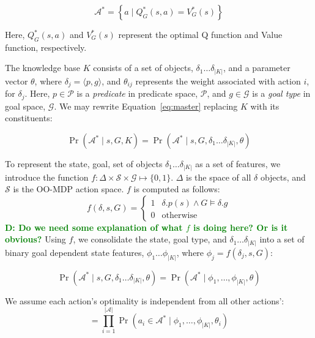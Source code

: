 \documentclass[conference]{IEEEtran}
\newcommand{\dnote}[1]{\textcolor{Green}{\textbf{D: #1}}}
\begin{document}
\begin{equation}
\mathcal{A}^* = \left\{ a \mid Q^*_G(s,a) = V^*_G(s) \right\}
\label{eq:opt_act_set}
\end{equation}

Here, $Q^*_G(s,a)$ and $V^*_G(s)$ represent the optimal Q function and 
Value function, respectively.

The knowledge base $K$ consists of a set of objects, $\delta_1 \ldots \delta_{|K|}$, and a 
parameter vector $\theta$, where $\delta_j = \langle p, g \rangle$, and $\theta_{ij}$
represents the weight associated with action $i$, for $\delta_j$. Here, $p \in \mathcal{P}$
is a {\it predicate} in predicate space, $\mathcal{P}$, and $g \in \mathcal{G}$ is a {\it goal type}
in goal space, $\mathcal{G}$. We may rewrite Equation~\ref{eq:master} replacing $K$ with
its constituents:

\begin{equation}
\Pr(\mathcal{A}^* \mid s, G, K) = \Pr(\mathcal{A}^* \mid s, G, \delta_1 \ldots \delta_{|K|}, \theta)
\end{equation}

To represent the state, goal, set of objects $\delta_1 \ldots \delta_{|K|}$ as a set of features,
we introduce the function $f : \Delta \times \mathcal{S} \times \mathcal{G} \mapsto \{0,1\}$.
$\Delta$ is the space of all $\delta$ objects, and $\mathcal{S}$
is the OO-MDP action space. $f$ is computed as follows:
\begin{equation}
f(\delta, s, G) = 
\begin{cases}
1& \delta.p(s) \wedge G \models \delta.g \\
0& \text{otherwise}
\end{cases}
\label{eq:f_func_def}
\end{equation}
\dnote{Do we need some explanation of what $f$ is doing here? Or is it obvious?}
Using $f$, we consolidate the state, goal type, and $\delta_1 \ldots \delta_{|K|}$ into a set of binary goal dependent
state features, $\phi_1 \ldots \phi_{|K|}$, where $\phi_j = f(\delta_j, s, G)$:

\begin{equation}
\Pr(\mathcal{A}^* \mid s, G, \delta_1 \ldots \delta_{|K|}, \theta) = \Pr(\mathcal{A}^* \mid \phi_1, \ldots, \phi_{|K|}, \theta)
\label{eq:feature_rep}
\end{equation}

We assume each action's optimality is independent from all other actions':
\begin{equation}
= \prod_{i=1}^{|\mathcal{A}|} \Pr(a_i \in \mathcal{A}^* \mid \phi_1, \ldots, \phi_{|K|}, \theta_i)
\label{eq:action_independ}
\end{equation}
\end{document}
